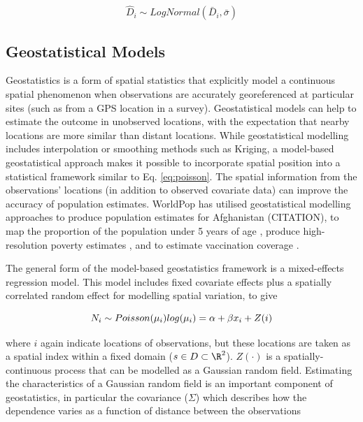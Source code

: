 \documentclass[]{book}
\begin{document}
\[
\hat{D}_i \sim LogNormal(\bar{D}_i, \bar{\sigma})
\]

\hypertarget{geostatistical-models}{\subsection{Geostatistical
Models}\label{geostatistical-models}}

Geostatistics is a form of spatial statistics that explicitly model a
continuous spatial phenomenon when observations are accurately
georeferenced at particular sites (such as from a GPS location in a
survey). Geostatistical models can help to estimate the outcome in
unobserved locations, with the expectation that nearby locations are
more similar than distant locations. While geostatistical modelling
includes interpolation or smoothing methods such as Kriging, a
model-based geostatistical approach \citep{diggle2016mbg} makes it
possible to incorporate spatial position into a statistical framework
similar to Eq. \eqref{eq:poisson}. The spatial information from the
observations' locations (in addition to observed covariate data) can
improve the accuracy of population estimates. WorldPop has utilised
geostatistical modelling approaches to produce population estimates for
Afghanistan (CITATION), to map the proportion of the population under 5
years of age \citep{alegana2015u5}, produce high-resolution poverty
estimates \citep{steele2017povertymap}, and to estimate vaccination
coverage \citep{utazi2019mapping}.

The general form of the model-based geostatistics framework is a
mixed-effects regression model. This model includes fixed covariate
effects plus a spatially correlated random effect for modelling spatial
variation, to give

\begin{equation}
  N_i \sim Poisson( \mu_i ) \\
  log(\mu_i) = \alpha + \beta x_i + Z(i)
  \label{eq:mbg}
\end{equation}

where \(i\) again indicate locations of observations, but these
locations are taken as a spatial index within a fixed domain
(\(s \in D \subset \R^2\)). \(Z(\cdot)\) is a spatially-continuous
process that can be modelled as a Gaussian random field. Estimating the
characteristics of a Gaussian random field is an important component of
geostatistics, in particular the covariance (\(\Sigma\)) which describes
how the dependence varies as a function of distance between the
observations
\end{document}
